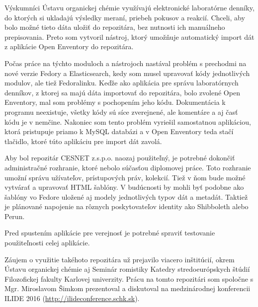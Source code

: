 \documentclass[thesis=M,slovak]{FITthesis}[2013/05/06]
\begin{document}
\begin{conclusion}
Výskumníci Ústavu organickej chémie využívajú elektronické laboratórne denníky, do ktorých si ukladajú výsledky meraní, priebeh pokusov a reakcií. Chceli, aby bolo možné tieto dáta uložiť do repozitára, bez nutnosti ich manuálneho prepisovania. Preto som vytvoril nástroj, ktorý umožňuje automatický import dát z aplikácie Open Enventory do repozitára.

Počas práce na týchto moduloch a nástrojoch nastával problém s prechodmi na nové verzie Fedory a Elasticsearch, kedy som musel upravovať kódy jednotlivých modulov, ale tiež Fedoralinku. Keďže ako aplikácia pre správu laboratórnych denníkov, z ktorej sa majú dáta importovať do repozitára, bolo zvolené Open Enventory, mal som problémy s pochopením jeho kódu. Dokumentácia k programu neexistuje, všetky kódy sú síce zverejnené, ale komentáre a aj časť kódu je v nemčine. Nakoniec som tento problém vyriešil samostatnou aplikáciou, ktorá pristupuje priamo k MySQL databázi a v Open Enventory teda stačí tlačidlo, ktoré túto aplikáciu pre import dát zavolá.

Aby bol repozitár CESNET z.s.p.o. naozaj použiteľný, je potrebné dokončiť administračné rozhranie, ktoré nebolo súčasťou diplomovej práce. Toto rozhranie umožní správu užívateľov, prístupových práv, kolekcií. Tiež v ňom bude možné vytvárať a upravovať HTML šablóny. V budúcnosti by mohli byť podobne ako šablóny vo Fedore uložené aj modely jednotlivých typov dát a metadát. Taktiež je plánované napojenie na rôznych poskytovateľov identity ako Shibboleth alebo Perun.

Pred spustením aplikácie pre verejnosť je potrebné spraviť testovanie použiteľnosti celej aplikácie.

Záujem o využitie takéhoto repozitára už prejavilo viacero inštitúcií, okrem Ústavu organickej chémie aj Seminár romistiky Katedry stredoeurópskych štúdií Filozofickej fakulty Karlovej univerzity. Prácu na tomto repozitári som spoločne s Mgr. Miroslavom Šimkom prezentoval a diskutoval na medzinárodnej konferencii ILIDE 2016 (\url{http://ilideconference.schk.sk}).
\end{conclusion}




\appendix
\end{document}
